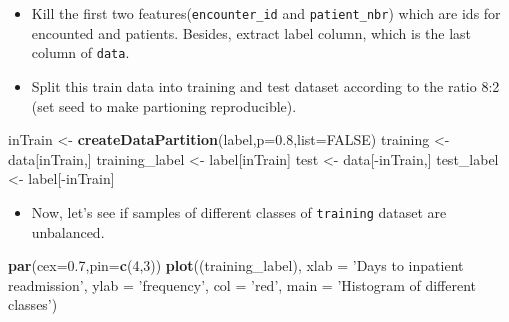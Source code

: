 \documentclass[]{article}
\newenvironment{Shaded}{\begin{snugshade}}{\end{snugshade}}
\newcommand{\KeywordTok}[1]{\textcolor[rgb]{0.13,0.29,0.53}{\textbf{{#1}}}}
\newcommand{\DataTypeTok}[1]{\textcolor[rgb]{0.13,0.29,0.53}{{#1}}}
\newcommand{\DecValTok}[1]{\textcolor[rgb]{0.00,0.00,0.81}{{#1}}}
\newcommand{\FloatTok}[1]{\textcolor[rgb]{0.00,0.00,0.81}{{#1}}}
\newcommand{\StringTok}[1]{\textcolor[rgb]{0.31,0.60,0.02}{{#1}}}
\newcommand{\OtherTok}[1]{\textcolor[rgb]{0.56,0.35,0.01}{{#1}}}
\newcommand{\NormalTok}[1]{{#1}}
\begin{document}
\begin{itemize}
  \begin{itemize}
  \itemsep1pt\parskip0pt
  \item
    Kill the first two features(\texttt{encounter\_id} and
    \texttt{patient\_nbr}) which are ids for encounted and patients.
    Besides, extract label column, which is the last column of
    \texttt{data}.
  \end{itemize}

\begin{Shaded}
\end{Shaded}

  \begin{itemize}
  \itemsep1pt\parskip0pt
  \item
    Split this train data into training and test dataset according to
    the ratio 8:2 (set seed to make partioning reproducible).
  \end{itemize}

\begin{Shaded}
\begin{Highlighting}[]
\NormalTok{inTrain <-}\StringTok{ }\KeywordTok{createDataPartition}\NormalTok{(label,}\DataTypeTok{p=}\FloatTok{0.8}\NormalTok{,}\DataTypeTok{list=}\OtherTok{FALSE}\NormalTok{)}
\NormalTok{training <-}\StringTok{ }\NormalTok{data[inTrain,]}
\NormalTok{training_label <-}\StringTok{ }\NormalTok{label[inTrain]}
\NormalTok{test <-}\StringTok{ }\NormalTok{data[-inTrain,]}
\NormalTok{test_label <-}\StringTok{ }\NormalTok{label[-inTrain]}
\end{Highlighting}
\end{Shaded}

  \begin{itemize}
  \itemsep1pt\parskip0pt
  \item
    Now, let's see if samples of different classes of \texttt{training}
    dataset are unbalanced.
  \end{itemize}

\begin{Shaded}
\begin{Highlighting}[]
\KeywordTok{par}\NormalTok{(}\DataTypeTok{cex=}\FloatTok{0.7}\NormalTok{,}\DataTypeTok{pin=}\KeywordTok{c}\NormalTok{(}\DecValTok{4}\NormalTok{,}\DecValTok{3}\NormalTok{))}
\KeywordTok{plot}\NormalTok{((training_label), }\DataTypeTok{xlab =} \StringTok{'Days to inpatient readmission'}\NormalTok{, }\DataTypeTok{ylab =} \StringTok{'frequency'}\NormalTok{,}
     \DataTypeTok{col =} \StringTok{'red'}\NormalTok{, }\DataTypeTok{main =} \StringTok{'Histogram of different classes'}\NormalTok{)}
\end{Highlighting}
\end{Shaded}


\end{itemize}
\end{document}
